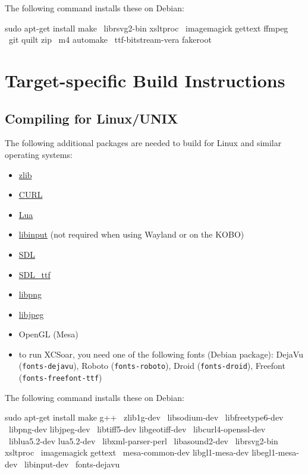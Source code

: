 The following command installs these on Debian:

\begin{verbatim*}
sudo apt-get install make \
  librsvg2-bin xsltproc \
  imagemagick gettext ffmpeg \
  git quilt zip \
  m4 automake \
  ttf-bitstream-vera fakeroot
\end{verbatim*}

\section{Target-specific Build Instructions}

\subsection{Compiling for Linux/UNIX}

The following additional packages are needed to build for Linux and
similar operating systems:

\begin{itemize}
\item \href{http://www.zlib.net/}{zlib}
\item \href{http://curl.haxx.se/}{CURL}
\item \href{http://www.lua.org/}{Lua}
\item \href{https://www.freedesktop.org/wiki/Software/libinput/}{libinput} (not required when using Wayland or on the KOBO)
\item \href{http://www.libsdl.org/}{SDL}
\item \href{http://www.libsdl.org/projects/SDL\_ttf/}{SDL\_ttf}
\item \href{http://www.libpng.org/}{libpng}
\item \href{http://libjpeg.sourceforge.net/}{libjpeg}
\item OpenGL (Mesa)
\item to run XCSoar, you need one of the following fonts (Debian
  package): DejaVu (\texttt{fonts-dejavu}),
  Roboto (\texttt{fonts-roboto}),
  Droid (\texttt{fonts-droid}),
  Freefont (\texttt{fonts-freefont-ttf})
\end{itemize}

The following command installs these on Debian:

\begin{verbatim*}
sudo apt-get install make g++ \
  zlib1g-dev \
  libsodium-dev \
  libfreetype6-dev \
  libpng-dev libjpeg-dev \
  libtiff5-dev libgeotiff-dev \
  libcurl4-openssl-dev \
  liblua5.2-dev lua5.2-dev \
  libxml-parser-perl \
  libasound2-dev \
  librsvg2-bin xsltproc \
  imagemagick gettext \
  mesa-common-dev libgl1-mesa-dev libegl1-mesa-dev \
  libinput-dev \
  fonts-dejavu
\end{verbatim*}

